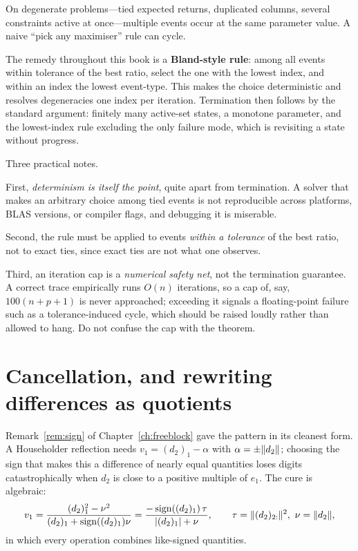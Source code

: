 On degenerate problems---tied expected returns, duplicated columns, several constraints
active at once---multiple events occur at the same parameter value. A naive ``pick any
maximiser'' rule can cycle.

The remedy throughout this book is a \textbf{Bland-style rule}: among all events within
tolerance of the best ratio, select the one with the lowest index, and within an index
the lowest event-type. This makes the choice deterministic and resolves degeneracies one
index per iteration. Termination then follows by the standard argument: finitely many
active-set states, a monotone parameter, and the lowest-index rule excluding the only
failure mode, which is revisiting a state without progress.

Three practical notes.

First, \emph{determinism is itself the point}, quite apart from termination. A solver
that makes an arbitrary choice among tied events is not reproducible across platforms,
BLAS versions, or compiler flags, and debugging it is miserable.

Second, the rule must be applied to events \emph{within a tolerance} of the best ratio,
not to exact ties, since exact ties are not what one observes.

Third, an iteration cap is a \emph{numerical safety net}, not the termination
guarantee. A correct trace empirically runs $O(n)$ iterations, so a cap of, say,
$100(n+p+1)$ is never approached; exceeding it signals a floating-point failure such as
a tolerance-induced cycle, which should be raised loudly rather than allowed to hang.
Do not confuse the cap with the theorem.

\section{Cancellation, and rewriting differences as quotients}

Remark~\ref{rem:sign} of Chapter~\ref{ch:freeblock} gave the pattern in its cleanest
form. A Householder reflection needs $v_1 = (d_2)_1 - \alpha$ with
$\alpha = \pm\lVert d_2 \rVert$; choosing the sign that makes this a difference of nearly equal
quantities loses digits catastrophically when $d_2$ is close to a positive multiple of
$e_1$. The cure is algebraic:
\[
  v_1 = \frac{(d_2)_1^2 - \nu^2}{(d_2)_1 + \operatorname{sign}((d_2)_1)\nu}
      = \frac{-\operatorname{sign}((d_2)_1)\,\tau}{|(d_2)_1| + \nu},
  \qquad \tau = \lVert (d_2)_{2:} \rVert^2, \ \nu = \lVert d_2 \rVert,
\]
in which every operation combines like-signed quantities.


